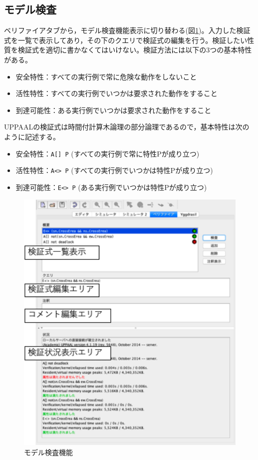 \documentclass{tpu-sotu}
\begin{document}
	\subsection{モデル検査}
		ベリファイアタブから，モデル検査機能表示に切り替わる(図\ref{sMV})。入力した検証式を一覧で表示してあり，その下のクエリで検証式の編集を行う。検証したい性質を検証式を適切に書かなくてはいけない。検証方法には以下の3つの基本特性がある。
	\begin{itemize}
  	\item 安全特性：すべての実行例で常に危険な動作をしないこと
 	\item 活性特性：すべての実行例でいつかは要求された動作をすること
  	\item 到達可能性：ある実行例でいつかは要求された動作をすること
	\end{itemize}
	UPPAALの検証式は時間付計算木論理の部分論理であるので，基本特性は次のように記述する。
	\begin{itemize}
  	\item 安全特性：{\tt{A[] P}} (すべての実行例で常に特性Pが成り立つ)
 	\item 活性特性：{\tt{A<> P}} (すべての実行例でいつかは特性Pが成り立つ)
  	\item 到達可能性：{\tt{E<> P}} (ある実行例でいつかは特性Pが成り立つ)
	\end{itemize}
	\begin{figure}[htbp]
	\centering
	\includegraphics[width=120mm]{showModelVerification.png}
	\caption{モデル検査機能}
	\label{sMV}
	\end{figure}
\end{document}
